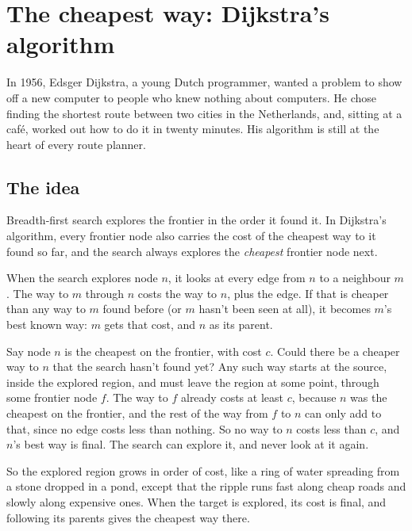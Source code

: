 \chapter{The cheapest way: Dijkstra's algorithm}\label{ch:dijkstra}

In 1956, Edsger Dijkstra, a young Dutch programmer, wanted a problem to
show off a new computer to people who knew nothing about computers. He
chose finding the shortest route between two cities in the Netherlands,
and, sitting at a café, worked out how to do it in twenty minutes. His
algorithm is still at the heart of every route planner.

\section{The idea}

Breadth-first search explores the frontier in the order it found it. In
Dijkstra's algorithm, every frontier node also carries the cost of the
cheapest way to it found so far, and the search always explores the
\emph{cheapest} frontier node next.

When the search explores node $n$, it looks at every edge from $n$ to a
neighbour $m$. The way to $m$ through $n$ costs the way to $n$, plus the
edge. If that is cheaper than any way to $m$ found before (or $m$ hasn't
been seen at all), it becomes $m$'s best known way: $m$ gets that cost,
and $n$ as its parent.

\begin{mathbox}
Say node $n$ is the cheapest on the frontier, with cost $c$. Could there
be a cheaper way to $n$ that the search hasn't found yet? Any such way
starts at the source, inside the explored region, and must leave the
region at some point, through some frontier node $f$. The way to $f$
already costs at least $c$, because $n$ was the cheapest on the frontier,
and the rest of the way from $f$ to $n$ can only add to that, since no edge
costs less than nothing. So no way to $n$ costs less than $c$, and $n$'s
best way is final. The search can explore it, and never look at it again.
\end{mathbox}

So the explored region grows in order of cost, like a ring of water
spreading from a stone dropped in a pond, except that the ripple runs
fast along cheap roads and slowly along expensive ones. When the target is
explored, its cost is final, and following its parents gives the cheapest
way there.

